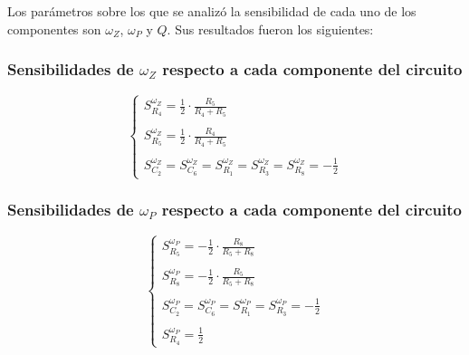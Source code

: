 Los par\'ametros sobre los que se analiz\'o la sensibilidad de cada uno de los componentes son $\omega_Z$, $\omega_P$ y $Q$. Sus resultados fueron los siguientes:

\subsubsection{Sensibilidades de $\omega_Z$ respecto a cada componente del circuito}
\begin{equation}
\begin{cases}
S^{\omega_Z}_{R_4}= \frac{1}{2} \cdot \frac{R_{5}}{R_{4} + R_{5}}\\ \\
S^{\omega_Z}_{R_5}= \frac{1}{2} \cdot \frac{R_{4}}{R_{4} + R_{5}}\\ \\
S^{\omega_Z}_{C_2} = S^{\omega_Z}_{C_6}= S^{\omega_Z}_{R_1}=S^{\omega_Z}_{R_3}=S^{\omega_Z}_{R_8}    =- \frac{1}{2} 
\end{cases}
\end{equation}

\subsubsection{Sensibilidades de $\omega_P$ respecto a cada componente del circuito}
\begin{equation}
\begin{cases}
S^{\omega_P}_{R_5} =	-  \frac{1}{2} \cdot \frac{R_{8}}{R_{5} + R_{8}} \\ \\
S^{\omega_P}_{R_8} =	-  \frac{1}{2} \cdot \frac{R_{5}}{R_{5} + R_{8}}\\ \\
S^{\omega_P}_{C_2} = S^{\omega_P}_{C_6}= S^{\omega_P}_{R_1}=S^{\omega_P}_{R_3}=	-  \frac{1}{2}\\ \\
S^{\omega_P}_{R_4} = \frac{1}{2}
\end{cases}
\end{equation}

